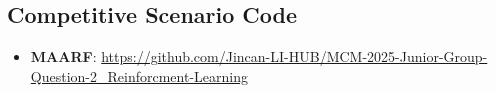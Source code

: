 \documentclass[twocolumn, a4paper]{article}
\begin{document}
\subsection{Competitive Scenario Code}
\label{app:competitive_code}
\begin{itemize}
    \item \textbf{MAARF}: \url{https://github.com/Jincan-LI-HUB/MCM-2025-Junior-Group-Question-2_Reinforcment-Learning}
\end{itemize}



\end{document}
